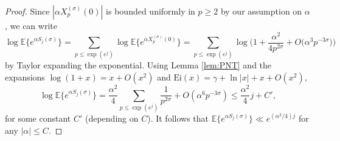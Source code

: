 \documentclass[10pt,a4paper]{amsart}
\begin{document}
\begin{proof}
Since $|\alpha X_p^{(\sigma)}(0)|$ is bounded uniformly in $p\geq 2$ by our assumption on $\alpha$,  we can write
\[
    \log \mathbb{E}\big\{e^{\alpha S_j(\sigma)}\big\}=\sum_{p\leq \exp(e^j)} \log \mathbb{E}\big\{e^{\alpha X_p^{(\sigma)}(0)}\big\}=\sum_{p\leq \exp(e^j)} \log \Big(1+\frac{\alpha^2}{4p^{2\sigma}}+O\big(\alpha^3 p^{-3\sigma}\big)\Big)
\]
by Taylor expanding the exponential. Using Lemma \ref{lem:PNT} and the expansions $\log(1+x)=x+O(x^2)$ and $\mathrm{Ei}(x)=\gamma+\ln|x|+x+O(x^2)$,  
\begin{equation}\label{eq:MGFinc}
     \log \mathbb{E}\big\{e^{\alpha S_j(\sigma)}\big\}=\frac{\alpha^2}{4}\sum_{p\leq \exp(e^j)}\frac{1}{p^{2\sigma}}+O(\alpha^6p^{-3\sigma})\leq \frac{\alpha^2}{4}j+C',
\end{equation}
for some constant $C'$ (depending on $C$). It follows that $\mathbb{E}\{e^{\alpha S_j(\sigma)}\}\ll e^{(\alpha^2/4)j}$ for any $|\alpha|\leq C$. 


\end{proof}
\end{document}
